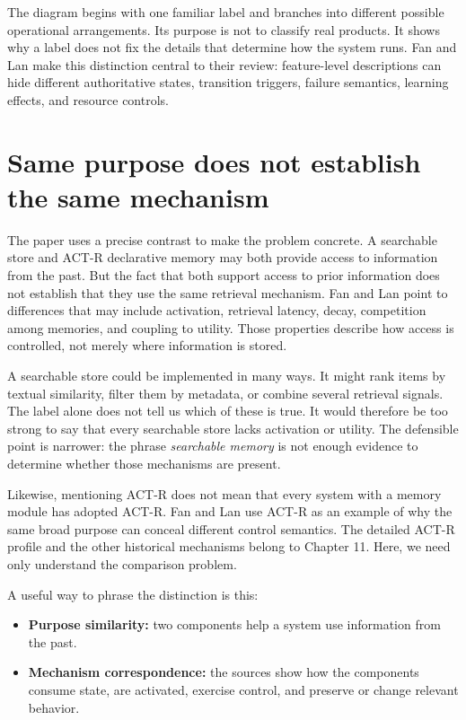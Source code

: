 The diagram begins with one familiar label and branches into different possible operational arrangements. Its purpose is not to classify real products. It shows why a label does not fix the details that determine how the system runs. Fan and Lan make this distinction central to their review: feature-level descriptions can hide different authoritative states, transition triggers, failure semantics, learning effects, and resource controls.

\section{Same purpose does not establish the same mechanism}
\label{sec:same-purpose-not-same-mechanism}

The paper uses a precise contrast to make the problem concrete. A searchable store and ACT-R declarative memory may both provide access to information from the past. But the fact that both support access to prior information does not establish that they use the same retrieval mechanism. Fan and Lan point to differences that may include activation, retrieval latency, decay, competition among memories, and coupling to utility. Those properties describe how access is controlled, not merely where information is stored.

A searchable store could be implemented in many ways. It might rank items by textual similarity, filter them by metadata, or combine several retrieval signals. The label alone does not tell us which of these is true. It would therefore be too strong to say that every searchable store lacks activation or utility. The defensible point is narrower: the phrase \emph{searchable memory} is not enough evidence to determine whether those mechanisms are present.

Likewise, mentioning ACT-R does not mean that every system with a memory module has adopted ACT-R. Fan and Lan use ACT-R as an example of why the same broad purpose can conceal different control semantics. The detailed ACT-R profile and the other historical mechanisms belong to Chapter 11. Here, we need only understand the comparison problem.

A useful way to phrase the distinction is this:
\begin{itemize}
  \item \textbf{Purpose similarity:} two components help a system use information from the past.
  \item \textbf{Mechanism correspondence:} the sources show how the components consume state, are activated, exercise control, and preserve or change relevant behavior.
\end{itemize}

